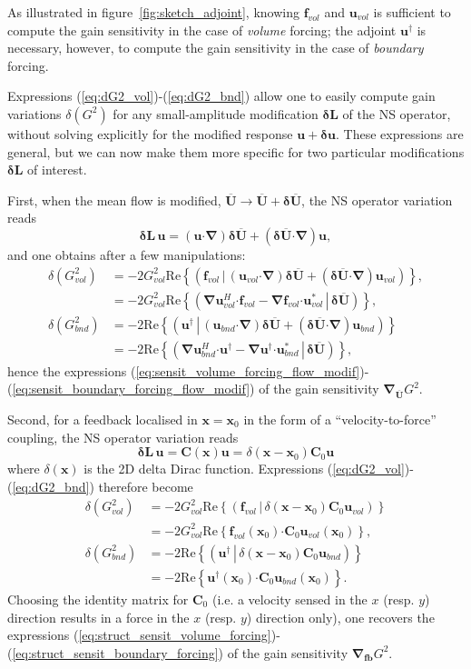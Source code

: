 \documentclass[11pt,onecolumn]{article}
\def\xx{\mathbf{x}}%
\def\be{\begin{equation}}
\def\ee{\end{equation}}
\def\CC{\mathbf{C}}
\def\ff {\mathbf{f}}
\def\LL{\mathbf{L}}
\def\uu {\mathbf{u}}
\def\UUm{\overline{\mathbf{U}}}
\def\feedback {\mathbf{fb}}
\newcommand{\ps}   [2]{\ensuremath{\left(\left. {#1} \, \right| \, {#2} \right) }}
\providecommand\bdelta{\boldsymbol{\delta}}\providecommand\bnabla{\boldsymbol{\nabla}}
\providecommand\bcdot{\boldsymbol{\cdot}}
\begin{document}
As illustrated in figure~\ref{fig:sketch_adjoint},
knowing $\ff_{vol}$ and $\uu_{vol}$ is sufficient to compute the gain sensitivity in the case of \textit{volume} forcing;
the adjoint $\uu^\dag$ is necessary, however,
to compute the gain sensitivity in the case of \textit{boundary} forcing.

Expressions (\ref{eq:dG2_vol})-(\ref{eq:dG2_bnd}) allow one to easily compute gain variations $\delta(G^2)$ for any small-amplitude modification $\bdelta \LL$ of the NS operator, without solving explicitly for the modified response $\uu+\bdelta\uu$.
These expressions are general, but we can now make them more specific for two particular modifications $\bdelta\LL$ of interest.

First, when the mean flow is modified, $\UUm \rightarrow \UUm+\bdelta\UUm$, 
the NS operator variation reads
\be 
\bdelta\LL\,\uu = (\uu \bcdot \bnabla)\bdelta\UUm +
(\bdelta\UUm \bcdot \bnabla) \uu,
\ee 
and one obtains after a few manipulations:
%
\begin{align}	
\delta (G_{vol}^2) 
&= -2 G_{vol}^2 \mbox{Re} \left\{\ps{\ff_{vol}}{ (\uu_{vol} \bcdot \bnabla)\bdelta\UUm +
(\bdelta\UUm \bcdot \bnabla) \uu_{vol} }\right\},
\nonumber
\\
&= -2 G_{vol}^2 \mbox{Re} \left\{ \ps{\bnabla\uu_{vol}^H     \bcdot \ff_{vol} 
-\bnabla\ff_{vol} \bcdot \uu_{vol}^*}{\bdelta\UUm} \right\},
%
\\
%
\delta (G_{bnd}^2) 
&= -2 \mbox{Re} \left\{\ps{\uu^\dag}{ (\uu_{bnd} \bcdot \bnabla)\bdelta\UUm +
(\bdelta\UUm \bcdot \bnabla) \uu_{bnd} }\right\}
\nonumber
\\
&= -2 \mbox{Re} \left\{ \ps{\bnabla\uu_{bnd}^H \bcdot \uu^\dag 
-\bnabla\uu^\dag \bcdot \uu_{bnd}^*}{\bdelta\UUm} \right\},
\end{align}
%
hence the expressions (\ref{eq:sensit_volume_forcing_flow_modif})-(\ref{eq:sensit_boundary_forcing_flow_modif})
of the gain sensitivity $\bnabla_{\UUm} G^2$.

Second, for a feedback localised in $\xx=\xx_0$ in the form of a ``velocity-to-force'' coupling,
the NS operator variation reads
\be 
\bdelta\LL\,\uu = \CC(\xx)\uu =  \delta(\xx-\xx_0)\CC_0\uu
\ee
where $\delta(\xx)$ is the 2D delta Dirac function.
Expressions (\ref{eq:dG2_vol})-(\ref{eq:dG2_bnd}) therefore become
\begin{align}	
\delta (G_{vol}^2) 
&= -2 G_{vol}^2 \mbox{Re} \left\{\ps{\ff_{vol}}{ \delta(\xx-\xx_0)\CC_0 \uu_{vol}} \right\}
\nonumber
\\
&= -2 G_{vol}^2 \mbox{Re} \left\{ \ff_{vol}(\xx_0) \bcdot \CC_0 \uu_{vol}(\xx_0) \right\},
%
\\
%
\delta (G_{bnd}^2) 
&= -2 \mbox{Re} \left\{ \ps{\uu^\dag}{ \delta(\xx-\xx_0)\CC_0 \uu_{bnd}} \right\}
\nonumber
\\
&= -2 \mbox{Re} \left\{ \uu^\dag(\xx_0) \bcdot \CC_0 \uu_{bnd}(\xx_0) \right\}.
\end{align}
Choosing  the identity matrix for $\CC_0$ (i.e. a velocity sensed in the $x$ (resp. $y$) direction results in a force in the $x$ (resp. $y$)  direction only), one recovers the expressions (\ref{eq:struct_sensit_volume_forcing})-(\ref{eq:struct_sensit_boundary_forcing}) of the gain sensitivity $\bnabla_{\feedback} G^2$.
\end{document}
